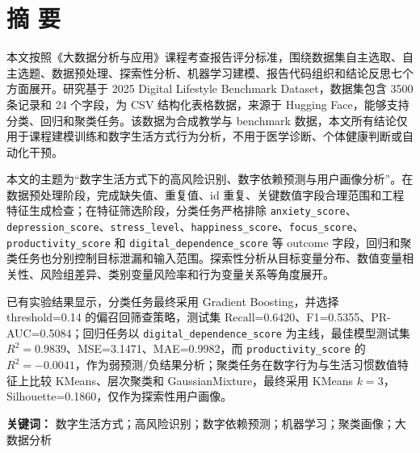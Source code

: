 \documentclass[UTF8,a4paper,12pt,openany]{ctexrep}
\begin{document}


\chapter*{摘 要}
本文按照《大数据分析与应用》课程考查报告评分标准，围绕数据集自主选取、自主选题、数据预处理、探索性分析、机器学习建模、报告代码组织和结论反思七个方面展开。研究基于 2025 Digital Lifestyle Benchmark Dataset，数据集包含 3500 条记录和 24 个字段，为 CSV 结构化表格数据，来源于 Hugging Face，能够支持分类、回归和聚类任务。该数据为合成教学与 benchmark 数据，本文所有结论仅用于课程建模训练和数字生活方式行为分析，不用于医学诊断、个体健康判断或自动化干预。

本文的主题为“数字生活方式下的高风险识别、数字依赖预测与用户画像分析”。在数据预处理阶段，完成缺失值、重复值、id 重复、关键数值字段合理范围和工程特征生成检查；在特征筛选阶段，分类任务严格排除 \texttt{anxiety\_score}、\texttt{depression\_score}、\texttt{stress\_level}、\texttt{happiness\_score}、\texttt{focus\_score}、\texttt{productivity\_score} 和 \texttt{digital\_dependence\_score} 等 outcome 字段，回归和聚类任务也分别控制目标泄漏和输入范围。探索性分析从目标变量分布、数值变量相关性、风险组差异、类别变量风险率和行为变量关系等角度展开。

已有实验结果显示，分类任务最终采用 Gradient Boosting，并选择 threshold=0.14 的偏召回筛查策略，测试集 Recall=0.6420、F1=0.5355、PR-AUC=0.5084；回归任务以 \texttt{digital\_dependence\_score} 为主线，最佳模型测试集 $R^2=0.9839$、MSE=3.1471、MAE=0.9982，而 \texttt{productivity\_score} 的 $R^2=-0.0041$，作为弱预测/负结果分析；聚类任务在数字行为与生活习惯数值特征上比较 KMeans、层次聚类和 GaussianMixture，最终采用 KMeans $k=3$，Silhouette=0.1860，仅作为探索性用户画像。

\noindent\textbf{关键词：} 数字生活方式；高风险识别；数字依赖预测；机器学习；聚类画像；大数据分析

\clearpage
\tableofcontents
\clearpage

\setcounter{page}{1}










\appendix




\end{document}
